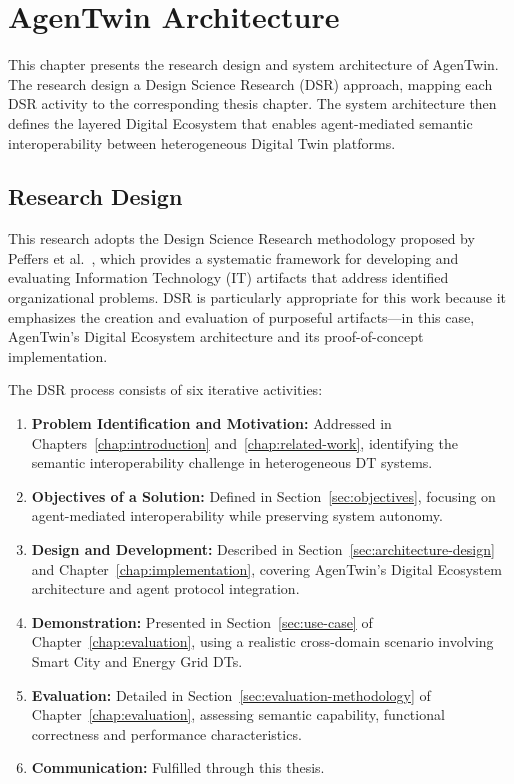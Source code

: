 \chapter{AgenTwin Architecture}
\label{chap:architecture}

This chapter presents the research design and system architecture of AgenTwin.
The research design a Design Science Research (DSR) approach,
    mapping each DSR activity to the corresponding thesis chapter.
The system architecture then defines the layered Digital Ecosystem that
    enables agent-mediated semantic interoperability between heterogeneous Digital Twin platforms.

\section{Research Design}
\label{sec:research-design}

This research adopts the Design Science Research methodology proposed by
    Peffers et al.~\cite{peffers2007}, which provides a
    systematic framework for developing and evaluating Information Technology (IT) artifacts that
    address identified organizational problems.
DSR is particularly appropriate for this work because it
    emphasizes the creation and evaluation of
    purposeful artifacts---in this case,
    AgenTwin's Digital Ecosystem architecture and its proof-of-concept implementation.

The DSR process consists of six iterative activities:

\begin{enumerate}
    \item \textbf{Problem Identification and Motivation:}
    Addressed in Chapters~\ref{chap:introduction} and~\ref{chap:related-work},
        identifying the semantic interoperability challenge in heterogeneous DT systems.
    
    \item \textbf{Objectives of a Solution:}
    Defined in Section~\ref{sec:objectives},
        focusing on agent-mediated interoperability while preserving system autonomy.
    
    \item \textbf{Design and Development:}
    Described in Section~\ref{sec:architecture-design} and Chapter~\ref{chap:implementation},
        covering AgenTwin's Digital Ecosystem architecture and agent protocol integration.
    
    \item \textbf{Demonstration:}
    Presented in Section~\ref{sec:use-case} of Chapter~\ref{chap:evaluation},
        using a realistic cross-domain scenario involving Smart City and Energy Grid DTs.

    \item \textbf{Evaluation:}
    Detailed in Section~\ref{sec:evaluation-methodology} of Chapter~\ref{chap:evaluation}, assessing
        semantic capability,
        functional correctness and
        performance characteristics.
    
    \item \textbf{Communication:}
    Fulfilled through this thesis.
\end{enumerate}

